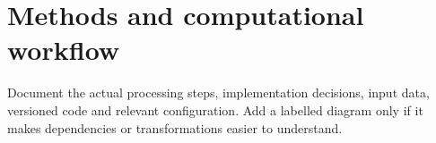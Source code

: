\section{Methods and computational workflow}
Document the actual processing steps, implementation decisions, input data,
versioned code and relevant configuration. Add a labelled diagram only if it
makes dependencies or transformations easier to understand.

